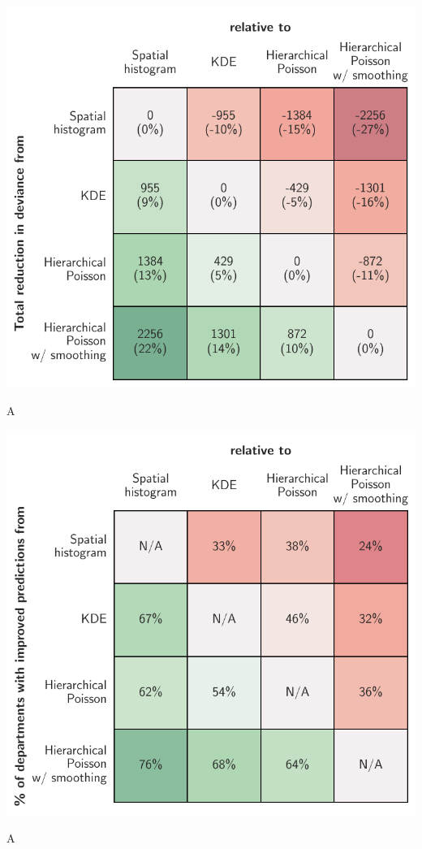 \documentclass{svjour3}
\begin{document}
    \begin{table}[htb] \centering
    \includegraphics[width=.75\textwidth]{figures/dev_table.pdf}
    \caption{A }
    \label{table:dev_table}
    \end{table}
  
    \begin{table}[htb] \centering
    \includegraphics[width=.75\textwidth]{figures/department_comparison.pdf}
    \caption{A}
    \label{table:dep_comparison}
    \end{table}
  
  
  
\end{document}

